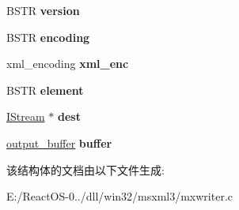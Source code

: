 \begin{DoxyCompactItemize}
\item 
\mbox{\label{structmxwriter_a8a3a2ebcb9ac4a357ea917a64972b748}} 
B\+S\+TR {\bfseries version}
\item 
\mbox{\label{structmxwriter_af7f8c2140077009a680ef57c7d7fd385}} 
B\+S\+TR {\bfseries encoding}
\item 
\mbox{\label{structmxwriter_a96f3698abb37b9aa4a6ee1a455626590}} 
xml\+\_\+encoding {\bfseries xml\+\_\+enc}
\item 
\mbox{\label{structmxwriter_aea8c98f4361d685a95f6f522d1541c7a}} 
B\+S\+TR {\bfseries element}
\item 
\mbox{\label{structmxwriter_ae20b936feb16bf77ab4896977c0d2f57}} 
\hyperlink{interface_i_stream}{I\+Stream} $\ast$ {\bfseries dest}
\item 
\mbox{\label{structmxwriter_a26a6e37c97f0bfe88f4936969189fc15}} 
\hyperlink{structoutput__buffer}{output\+\_\+buffer} {\bfseries buffer}
\end{DoxyCompactItemize}


该结构体的文档由以下文件生成\+:\begin{DoxyCompactItemize}
\item 
E\+:/\+React\+O\+S-\/0../dll/win32/msxml3/mxwriter.\+c\end{DoxyCompactItemize}
